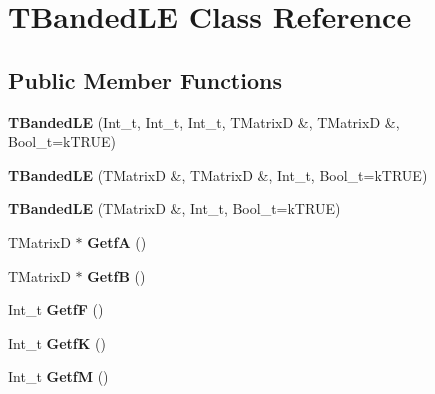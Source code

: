 \hypertarget{classTBandedLE}{
\section{TBandedLE Class Reference}
\label{classTBandedLE}
}
\subsection*{Public Member Functions}
\begin{DoxyCompactItemize}
\item 
\hypertarget{classTBandedLE_aa14ae5ca290e2c7512dd2346b6b0f82b}{
{\bfseries TBandedLE} (Int\_\-t, Int\_\-t, Int\_\-t, TMatrixD \&, TMatrixD \&, Bool\_\-t=kTRUE)}
\label{classTBandedLE_aa14ae5ca290e2c7512dd2346b6b0f82b}

\item 
\hypertarget{classTBandedLE_a62d58cca8eabaf62313b47ff0c9d3c82}{
{\bfseries TBandedLE} (TMatrixD \&, TMatrixD \&, Int\_\-t, Bool\_\-t=kTRUE)}
\label{classTBandedLE_a62d58cca8eabaf62313b47ff0c9d3c82}

\item 
\hypertarget{classTBandedLE_a7de8222c8c49c6de6aac0b127c467c42}{
{\bfseries TBandedLE} (TMatrixD \&, Int\_\-t, Bool\_\-t=kTRUE)}
\label{classTBandedLE_a7de8222c8c49c6de6aac0b127c467c42}

\item 
\hypertarget{classTBandedLE_a3db0645bedc75741b01308191777d2b1}{
TMatrixD $\ast$ {\bfseries GetfA} ()}
\label{classTBandedLE_a3db0645bedc75741b01308191777d2b1}

\item 
\hypertarget{classTBandedLE_a2cc97bfdf9f195abef626170383fd14c}{
TMatrixD $\ast$ {\bfseries GetfB} ()}
\label{classTBandedLE_a2cc97bfdf9f195abef626170383fd14c}

\item 
\hypertarget{classTBandedLE_a020a24f63feaf81164cb131c974706bf}{
Int\_\-t {\bfseries GetfF} ()}
\label{classTBandedLE_a020a24f63feaf81164cb131c974706bf}

\item 
\hypertarget{classTBandedLE_a8d9b1457a47e508d0986a40f7d0dd3ef}{
Int\_\-t {\bfseries GetfK} ()}
\label{classTBandedLE_a8d9b1457a47e508d0986a40f7d0dd3ef}

\item 
\hypertarget{classTBandedLE_abafb965cc802c0675fa5d692bee1b7e6}{
Int\_\-t {\bfseries GetfM} ()}
\label{classTBandedLE_abafb965cc802c0675fa5d692bee1b7e6}


\end{DoxyCompactItemize}
